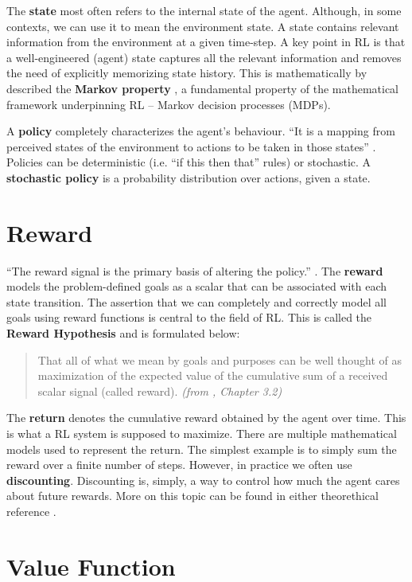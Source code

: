 The \textbf{state} most often refers to the internal state of the agent.
Although, in some contexts, we can use it to mean the environment state.
A state contains relevant information from the environment at a given time-step.
A key point in RL is that a well-engineered (agent) state captures all the relevant information and removes the need of explicitly memorizing state history.
This is mathematically by described the \textbf{Markov property} \cite{silver-lectures}, a fundamental property of the mathematical framework underpinning RL -- Markov decision processes (MDPs).

A \textbf{policy} completely characterizes the agent’s behaviour.
``It is a mapping from perceived states of the environment to actions to be taken in those states'' \cite{rlai}.
Policies can be deterministic (i.e. ``if this then that'' rules) or stochastic.
A \textbf{stochastic policy}\cite{silver-lectures} is a probability distribution over actions, given a state.

\section{Reward}
``The reward signal is the primary basis of altering the policy.'' \cite{rlai}.
The \textbf{reward} models the problem-defined goals as a scalar that can be associated with each state transition.
The assertion that we can completely and correctly model all goals using reward functions is central to the field of RL.
This is called the \textbf{Reward Hypothesis} and is formulated below:
\begin{quotation}
    That all of what we mean by goals and purposes can be well thought of as maximization of the expected value of the cumulative sum of a received scalar signal (called reward). \textit{(from \cite{rlai}, Chapter 3.2)}
\end{quotation}

The \textbf{return} denotes the cumulative reward obtained by the agent over time.
This is what a RL system is supposed to maximize.
There are multiple mathematical models used to represent the return.
The simplest example is to simply sum the reward over a finite number of steps.
However, in practice we often use \textbf{discounting}.
Discounting is, simply, a way to control how much the agent cares about future rewards.
More on this topic can be found in either theorethical reference \cite{rlai,silver-lectures}.

\section{Value Function}\label{rl:value-func}

